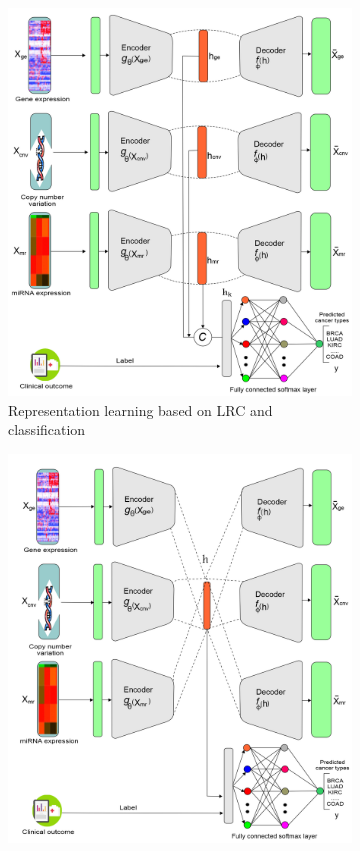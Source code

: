 \begin{figure}
	\centering
	\begin{subfigure}{.48\linewidth}
		\centering
		\includegraphics[scale=0.7]{images/lrc_rl_mcae.png}
		\caption{Representation learning based on LRC and classification}
        \label{fig:lrc_11}
	\end{subfigure}
	\begin{subfigure}{0.48\linewidth}
		\centering
		\includegraphics[scale=0.7]{images/clr_rl_mcae.png}

\end{subfigure}
\end{figure}
